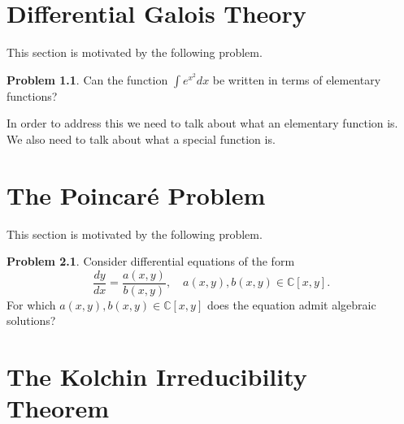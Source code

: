 \documentclass[12pt]{book}
\numberwithin{equation}{section}
\theoremstyle{definition}
\newtheorem{problem}[theorem]{Problem}
\theoremstyle{remark}
\newcommand{\CC}{\mathbb{C}}
\begin{document}



\chapter[Differential Galois Theory]{Differential Galois Theory}

This section is motivated by the following problem.
\begin{problem}
	Can the function $\int e^{x^2} dx$ be written in terms of elementary functions?
\end{problem}
In order to address this we need to talk about what an elementary function is. 
We also need to talk about what a special function is. 

\chapter[Poincar\'e Problem]{The Poincar\'e Problem}

This section is motivated by the following problem.
\begin{problem}
	Consider differential equations of the form
	 $$ \dfrac{dy}{dx} = \frac{a(x,y)}{b(x,y)}, \quad a(x,y),b(x,y) \in \CC[x,y].$$
	 For which $a(x,y),b(x,y) \in \CC[x,y]$ does the equation admit algebraic solutions?
\end{problem}


\chapter[Kolchin Irreducibility]{The Kolchin Irreducibility Theorem}\label{S:kolchin-irreducibility}
\end{document}
